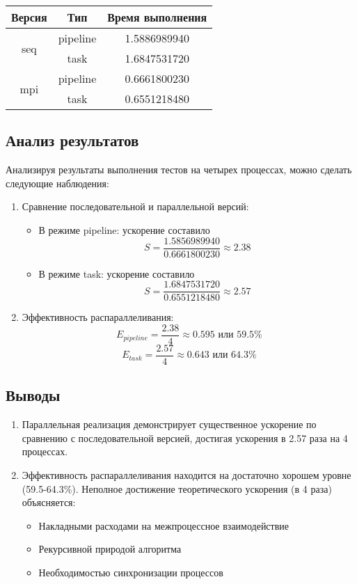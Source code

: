 \documentclass[12pt]{article}
\begin{document}
\begin{center}
\begin{tabular}{|c|c|c|}
\hline
     Версия & Тип & Время выполнения\\
\hline
\multirow{2}{*}{seq} & pipeline & 1.5886989940 \\
\cline{2-3}
& task & 1.6847531720 \\
    \hline
\multirow{2}{*}{mpi} & pipeline & 0.6661800230 \\
\cline{2-3}
& task & 0.6551218480 \\
\hline
\end{tabular}
\end{center}

\subsection{Анализ результатов}
Анализируя результаты выполнения тестов на четырех процессах, можно сделать следующие наблюдения:
\begin{enumerate}
    \item Сравнение последовательной и параллельной версий:
    \begin{itemize}
        \item В режиме pipeline: ускорение составило 
            \[ S = \frac{1.5856989940}{0.6661800230} \approx 2.38 \]
        \item В режиме task: ускорение составило
            \[ S = \frac{1.6847531720}{0.6551218480} \approx 2.57 \]
    \end{itemize}

    \item Эффективность распараллеливания:
        \[ E_{pipeline} = \frac{2.38}{4} \approx 0.595 \text{ или } 59.5\% \]
        \[ E_{task} = \frac{2.57}{4} \approx 0.643 \text{ или } 64.3\% \]
\end{enumerate}

\subsection{Выводы}

\begin{enumerate}
    \item Параллельная реализация демонстрирует существенное ускорение по сравнению с последовательной версией, достигая ускорения в 2.57 раза на 4 процессах.
    
    \item Эффективность распараллеливания находится на достаточно хорошем уровне (59.5-64.3\%). Неполное достижение теоретического ускорения (в 4 раза) объясняется:
    \begin{itemize}
        \item Накладными расходами на межпроцессное взаимодействие
        \item Рекурсивной природой алгоритма
        \item Необходимостью синхронизации процессов
    \end{itemize}
\end{enumerate}
\end{document}
